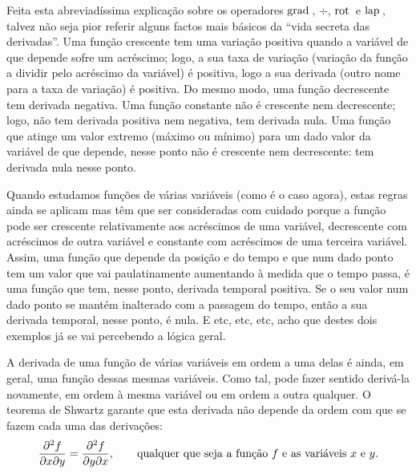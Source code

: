 \vspace{20mm}
{\small%
\noindent
  Feita esta abreviadíssima explicação sobre os operadores $\text{grad}\,$, $\div$,
  $\text{rot}\,$ e $\text{lap}\,$, talvez não seja pior referir alguns factos mais básicos da
  ``vida secreta das derivadas''. Uma função crescente tem uma variação positiva
  quando a variável de que depende sofre um acréscimo; logo, a sua taxa de
  variação (variação da função a dividir pelo acréscimo da variável) é positiva,
  logo a sua derivada (outro nome para a taxa de variação) é positiva. Do mesmo
  modo, uma função decrescente tem derivada negativa. Uma função constante não é
  crescente nem decrescente; logo, não tem derivada positiva nem negativa, tem
  derivada nula.  Uma função que atinge um valor extremo (máximo ou mínimo) para
  um dado valor da variável de que depende, nesse ponto não é crescente nem
  decrescente: tem derivada nula nesse ponto.

  Quando estudamos funções de várias variáveis (como é o caso agora), estas
  regras ainda se aplicam mas têm que ser consideradas com cuidado porque a
  função pode ser crescente relativamente aos acréscimos de uma variável,
  decrescente com acréscimos de outra variável e constante com acréscimos de uma
  terceira variável. Assim, uma função que depende da posição e do tempo e que
  num dado ponto tem um valor que vai paulatinamente aumentando à medida que o
  tempo passa, é uma função que tem, nesse ponto, derivada temporal positiva. Se
  o seu valor num dado ponto se mantém inalterado com a passagem do tempo, então
  a sua derivada temporal, nesse ponto, é nula. E etc, etc, etc, acho que destes
  dois exemplos já se vai percebendo a lógica geral.

  A derivada de uma função de várias variáveis em ordem a uma delas é ainda, em
  geral, uma função dessas mesmas variáveis. Como tal, pode fazer sentido
  derivá-la novamente, em ordem à mesma variável ou em ordem a outra qualquer. O
  teorema de Shwartz garante que esta derivada não depende da ordem com que se
  fazem cada uma das derivações:
  \begin{equation*}
    \frac{\partial^2 f}{\partial x\partial y}=
    \frac{\partial^2 f}{\partial y\partial x},\qquad\text{qualquer que seja a função $f$ e as variáveis $x$
    e $y$.}
  \end{equation*}
}

